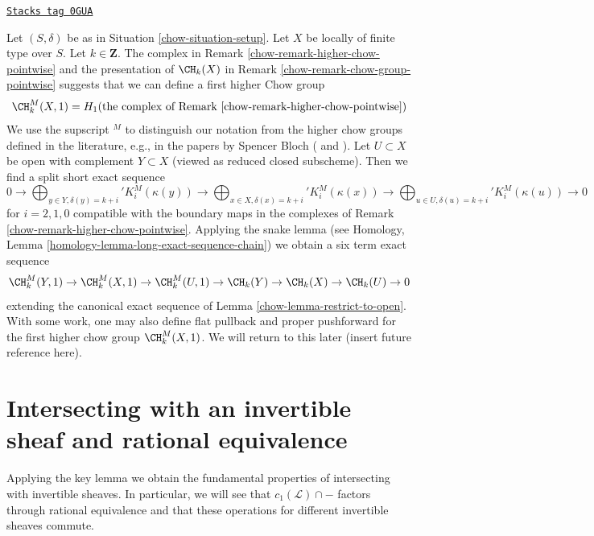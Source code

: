\begin{remark}
\label{chow-remark-higher-chow}
\href{https://stacks.math.columbia.edu/tag/0GUA}{\texttt{Stacks tag 0GUA}}

Let $(S, \delta)$ be as in Situation \ref{chow-situation-setup}.
Let $X$ be locally of finite type over $S$. Let $k \in \mathbf{Z}$.
The complex in Remark \ref{chow-remark-higher-chow-pointwise} and the
presentation of $\CH_k(X)$ in Remark \ref{chow-remark-chow-group-pointwise}
suggests that we can define a first higher Chow group
$$
\CH^M_k(X, 1) =
H_1(\text{the complex of Remark \ref{chow-remark-higher-chow-pointwise}})
$$
We use the supscript ${}^M$ to distinguish our notation from the
higher chow groups defined in the literature, e.g., in the papers
by Spencer Bloch (\cite{Bloch} and \cite{Bloch-moving}).
Let $U \subset X$ be open with complement $Y \subset X$ (viewed as reduced
closed subscheme). Then we find a split short exact sequence
$$
0 \to
\bigoplus\nolimits_{y \in Y, \delta(y) = k + i}' K_i^M(\kappa(y)) \to
\bigoplus\nolimits_{x \in X, \delta(x) = k + i}' K_i^M(\kappa(x)) \to
\bigoplus\nolimits_{u \in U, \delta(u) = k + i}' K_i^M(\kappa(u)) \to 0
$$
for $i = 2, 1, 0$ compatible with the boundary maps in the complexes
of Remark \ref{chow-remark-higher-chow-pointwise}. Applying the snake lemma
(see Homology, Lemma \ref{homology-lemma-long-exact-sequence-chain})
we obtain a six term exact sequence
$$
\CH^M_k(Y, 1) \to \CH^M_k(X, 1) \to \CH^M_k(U, 1) \to
\CH_k(Y) \to \CH_k(X) \to \CH_k(U) \to 0
$$
extending the canonical exact sequence of Lemma \ref{chow-lemma-restrict-to-open}.
With some work, one may also define flat pullback and proper pushforward
for the first higher chow group $\CH^M_k(X, 1)$. We will return to this
later (insert future reference here).
\end{remark}

\section{Intersecting with an invertible sheaf and rational equivalence}
\label{chow-section-commutativity}
Applying the key lemma we obtain the fundamental properties of intersecting
with invertible sheaves. In particular, we will see that
$c_1(\mathcal{L}) \cap -$ factors through rational equivalence and
that these operations for different invertible sheaves commute.

